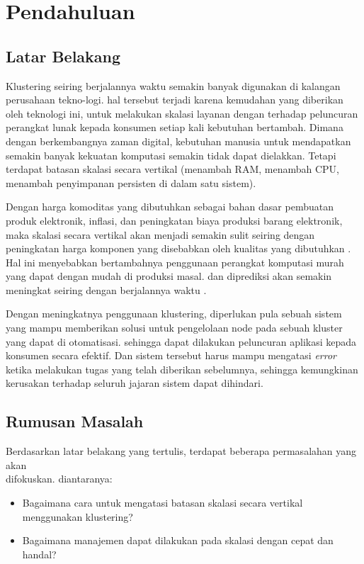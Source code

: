 \section{Pendahuluan}
\subsection{Latar Belakang}
Klustering seiring berjalannya waktu semakin banyak digunakan di kalangan perusahaan tekno-logi. hal tersebut terjadi karena kemudahan yang diberikan oleh teknologi ini, untuk melakukan skalasi layanan dengan terhadap peluncuran perangkat lunak kepada konsumen setiap kali kebutuhan bertambah. Dimana dengan berkembangnya zaman digital, kebutuhan manusia untuk mendapatkan semakin banyak kekuatan komputasi semakin tidak dapat dielakkan. Tetapi terdapat batasan skalasi secara vertikal (menambah RAM, menambah CPU, menambah penyimpanan persisten di dalam satu sistem).

\vspace{0.2cm}
\noindent Dengan harga komoditas yang dibutuhkan sebagai bahan dasar pembuatan produk elektronik, inflasi, dan peningkatan biaya produksi barang elektronik, maka skalasi secara vertikal akan menjadi semakin sulit seiring dengan peningkatan harga komponen yang disebabkan oleh kualitas yang dibutuhkan \cite{electronic_cost}. Hal ini menyebabkan bertambahnya penggunaan perangkat komputasi murah yang dapat dengan mudah di produksi masal. dan diprediksi akan semakin meningkat seiring dengan berjalannya waktu \cite{raspi_market}.

\vspace{0.2cm}
\noindent Dengan meningkatnya penggunaan klustering, diperlukan pula sebuah sistem yang mampu memberikan solusi untuk pengelolaan node pada sebuah kluster yang dapat di otomatisasi. sehingga dapat dilakukan peluncuran aplikasi kepada konsumen secara efektif. Dan sistem tersebut harus mampu mengatasi \textit{error} ketika melakukan tugas yang telah diberikan sebelumnya, sehingga kemungkinan kerusakan terhadap seluruh jajaran sistem dapat dihindari.


\subsection{Rumusan Masalah}
Berdasarkan latar belakang yang tertulis, terdapat beberapa permasalahan yang akan\\difokuskan. diantaranya:
\begin{itemize}
    \item Bagaimana cara untuk mengatasi batasan skalasi secara vertikal menggunakan klustering?
    \item Bagaimana manajemen dapat dilakukan pada skalasi dengan cepat dan handal?
\end{itemize}

